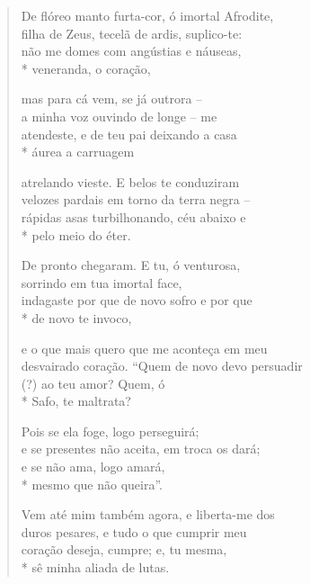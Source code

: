 \begin{verse}
De flóreo manto furta-cor, ó imortal Afrodite,\\
filha de Zeus, tecelã de ardis, suplico-te:\\
não me domes com angústias e náuseas,\\*
veneranda, o coração,

mas para cá vem, se já outrora --\\
a minha voz ouvindo de longe -- me\\
atendeste, e de teu pai deixando a casa\\*
áurea a carruagem

atrelando vieste. E belos te conduziram\\
velozes pardais em torno da terra negra --\\
rápidas asas turbilhonando, céu abaixo e\\*
pelo meio do éter.

De pronto chegaram. E tu, ó venturosa,\\
sorrindo em tua imortal face,\\
indagaste por que de novo sofro e por que\\*
de novo te invoco,

e o que mais quero que me aconteça em meu\\
desvairado coração. “Quem de novo devo persuadir\\
(?) ao teu amor? Quem, ó\\*
Safo, te maltrata?

Pois se ela foge, logo perseguirá;\\
e se presentes não aceita, em troca os dará;\\
e se não ama, logo amará,\\*
mesmo que não queira”.

Vem até mim também agora, e liberta-me dos\\
duros pesares, e tudo o que cumprir meu\\
coração deseja, cumpre; e, tu mesma,\\*
sê minha aliada de lutas.
\end{verse}

